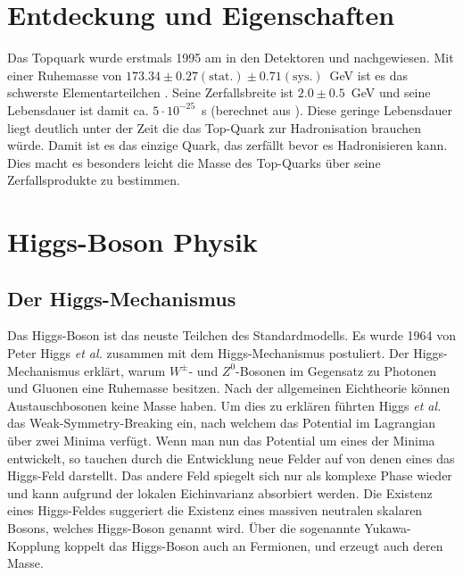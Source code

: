 \section{Entdeckung und Eigenschaften}
Das Topquark wurde erstmals 1995 am \tevatron in den Detektoren \dzero und \cdf nachgewiesen\cite{PhysRevLett.74.2626}. Mit einer Ruhemasse von $173.34 \pm 0.27(\text{stat.}) \pm 0.71 (\text{sys.})$~GeV ist es das schwerste Elementarteilchen \cite{ATLAS:2014wva}. Seine Zerfallsbreite ist $2.0\pm0.5$~GeV und seine Lebensdauer ist damit ca. $5\cdot10^{-25}$~s (berechnet aus \cite{2006EPJC...48..835Q}). Diese geringe Lebensdauer liegt deutlich unter der Zeit die das Top-Quark zur Hadronisation brauchen würde. Damit ist es das einzige Quark, das zerfällt bevor es Hadronisieren kann. Dies macht es besonders leicht die Masse des Top-Quarks über seine Zerfallsprodukte zu bestimmen.
 

\section{Higgs-Boson Physik}
\subsection{Der Higgs-Mechanismus}
Das Higgs-Boson ist das neuste Teilchen des Standardmodells. Es wurde 1964 von Peter Higgs \emph{et al.} zusammen mit dem Higgs-Mechanismus postuliert\cite{Higgs:1964pj}. Der Higgs-Mechanismus erklärt, warum $W^\pm$- und $Z^0$-Bosonen im Gegensatz zu Photonen und Gluonen eine Ruhemasse besitzen. Nach der allgemeinen Eichtheorie können Austauschbosonen keine Masse haben. Um dies zu erklären führten Higgs \emph{et al.} das Weak-Symmetry-Breaking ein, nach welchem das Potential im Lagrangian über zwei Minima verfügt. Wenn man nun das Potential um eines der Minima entwickelt, so tauchen durch die Entwicklung neue Felder auf von denen eines das Higgs-Feld darstellt\cite{halzen2008quark}. Das andere Feld spiegelt sich nur als komplexe Phase wieder und kann aufgrund der lokalen Eichinvarianz absorbiert werden. Die Existenz eines Higgs-Feldes suggeriert die Existenz eines massiven neutralen skalaren Bosons, welches Higgs-Boson genannt wird.
Über die sogenannte Yukawa-Kopplung koppelt das Higgs-Boson auch an Fermionen, und erzeugt auch deren Masse.
